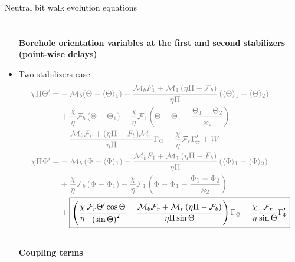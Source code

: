 \documentclass{beamer}
\begin{document}
\begin{frame}{Neutral bit walk evolution equations}
\begin{itemize}
\begin{equation}
\begin{aligned}
		\end{aligned}
		\nonumber
		\end{equation}\\
		\textbf{Borehole orientation variables at the first and second stabilizers (point-wise delays)}
		\item <5|only@5> [] Two stabilizers case: \footnotesize
		\begin{equation}
		\begin{aligned}
		\color{gray}\chi \Pi \Theta ' =  &\color{gray}- \mathcal{M}_b(\Theta-\langle\Theta \rangle_1)-\frac{{{\mathcal{M}_b}{F_1} + {\mathcal{M}_1}\left( {\eta \Pi  - {\mathcal{F}_b}} \right)}}{{\eta \Pi }}\left( {{\langle{\Theta} \rangle_1} - {\langle{\Theta} \rangle_{2}}} \right)
		\\
		&\color{gray}+\frac{\chi }{\eta }{\mathcal{F}_b}\left( {{\Theta} - {{\Theta}_1}} \right)
		- \frac{\chi }{\eta }{\mathcal{F}_1}\left( {{{{{\Theta}} - {{\Theta}_1}}} - \frac{{{{\Theta}_1} - {{\Theta}_{2}}}}{{{\varkappa _{2}}}}} \right)
		\\
		&\color{gray}- \frac{{{\mathcal{M}_b}{\mathcal{F}_r} + (\eta \Pi  - {F_b}){\mathcal{M}_r}}}{{\eta \Pi }}{\Gamma _{\Theta}} - \frac{\chi }{\eta }{\mathcal{F}_r}\Gamma_{\!\Theta}' + W
		\\
		\color{gray}\chi \Pi \Phi ' =  &\color{gray}- {\mathcal{M}_b}\left( {\Phi  - {\langle{\Phi} \rangle_1}} \right)-\frac{{{\mathcal{M}_b}{F_1} + {\mathcal{M}_1}\left( {\eta \Pi  - {F_b}} \right)}}{{\eta \Pi }}\left( {{\langle{\Phi} \rangle_1} - {\langle{\Phi} \rangle_{2}}} \right)
		\\
		&\color{gray}+\frac{\chi }{\eta }{\mathcal{F}_b}\left( {{\Phi} - {{\Phi}_1}} \right)
		- \frac{\chi }{\eta }{\mathcal{F}_1}\left( {{{{{\Phi}} - {{\Phi}_1}}} - \frac{{{{\Phi}_1} - {{\Phi}_{2}}}}{{{\varkappa _{2}}}}} \right)
		\\
		&+ \boxed{ \left( {\frac{\chi }{\eta }\frac{{{\mathcal{F}_r}\Theta '\cos \Theta }}{{{{\left( {\sin \Theta } \right)}^2}}} - \frac{{{\mathcal{M}_b}{\mathcal{F}_r} + {\mathcal{M}_r}\left( {\eta \Pi  - {\mathcal{F}_b}} \right)}}{{\eta \Pi \sin \Theta }}} \right){\Gamma _{\Phi}} - \frac{\chi }{\eta }\frac{{{\mathcal{F}_r}}}{{\sin \Theta }}\Gamma_{\!\Phi}'}
		\\
		\\
		\end{aligned}
		\nonumber
		\end{equation}
		\normalsize \centering \textbf{ \centering Coupling terms}
	\end{itemize}
\end{frame}
\end{document}
